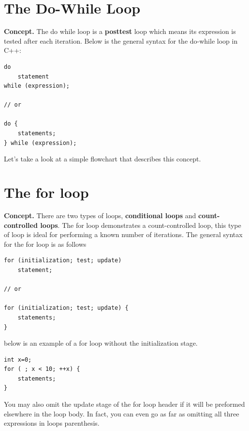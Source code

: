 \documentclass{report}
\begin{document}
    \pagebreak \bigbreak \noindent 
    \section{\LARGE The Do-While Loop}
    \bigbreak \noindent 
    \textbf{Concept.} The do while loop is a \textbf{posttest} loop which means its expression is tested after each iteration. Below is the general syntax for the do-while loop in C++:
    \bigbreak \noindent 
    \sepline
    \begin{verbatim}
do 
    statement
while (expression);

// or 

do {
    statements;
} while (expression);
    \end{verbatim}
    \sepline
    \bigbreak \noindent 
    \begin{minipage}[]{0.47\textwidth}
        Let's take a look at a simple flowchart that describes this concept.
    
    \end{minipage}
    \begin{minipage}[]{0.47\textwidth}
    \end{minipage}

    \pagebreak \bigbreak \noindent 
    \section{\LARGE The for loop}
    \bigbreak \noindent 
    \textbf{Concept.} There are two types of loops, \textbf{conditional loops} and \textbf{count-controlled loops}. The for loop demonstrates a count-controlled loop, this type of loop is ideal for performing a known number of iterations.
    \bigbreak \noindent 
    The general syntax for the for loop is as follows
    \bigbreak \noindent 
    \sepline
    \begin{verbatim}
for (initialization; test; update)  
    statement;

// or

for (initialization; test; update) { 
    statements;
}
    \end{verbatim}
    \sepline

    \bigbreak \noindent 
    \bigbreak \noindent 
    below is an example of a for loop without the initialization stage.
    \bigbreak \noindent 
    \sepline
    \begin{verbatim}
int x=0;
for ( ; x < 10; ++x) {
    statements;
}

    \end{verbatim}
    \sepline
    \bigbreak \noindent 
    You may also omit the update stage of the for loop header if it will be preformed elsewhere in the loop body. In fact, you can even go as far as omitting all three expressions in loops parenthesis.
\end{document}
